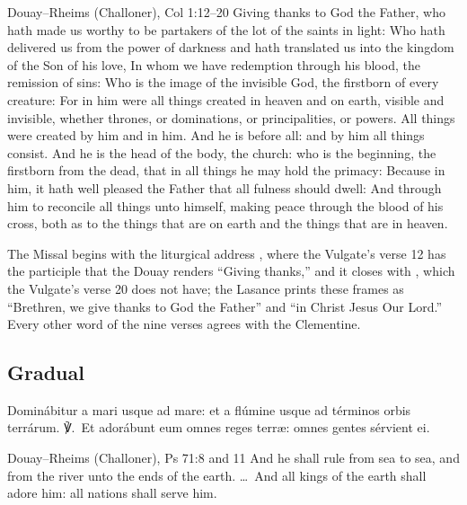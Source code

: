 \begin{englishwitness}{Douay--Rheims (Challoner), Col 1:12--20}
Giving thanks to God the Father, who hath made us worthy to be partakers of
the lot of the saints in light: Who hath delivered us from the power of
darkness and hath translated us into the kingdom of the Son of his love, In
whom we have redemption through his blood, the remission of sins: Who is the
image of the invisible God, the firstborn of every creature: For in him were
all things created in heaven and on earth, visible and invisible, whether
thrones, or dominations, or principalities, or powers. All things were created
by him and in him. And he is before all: and by him all things consist. And he
is the head of the body, the church: who is the beginning, the firstborn from
the dead, that in all things he may hold the primacy: Because in him, it hath
well pleased the Father that all fulness should dwell: And through him to
reconcile all things unto himself, making peace through the blood of his
cross, both as to the things that are on earth and the things that are in
heaven.
\end{englishwitness}

\noindent The Missal begins with the liturgical address , where the Vulgate's verse 12 has the participle  that the Douay renders ``Giving thanks,'' and it closes with , which the Vulgate's verse 20 does not have; the
Lasance prints these frames as ``Brethren, we give thanks to God the Father''
and ``in Christ Jesus Our Lord.'' Every other word of the nine verses agrees
with the Clementine.

\subsection{Gradual}
\label{proper-gradual}


\begin{latinproper}
Dominábitur a mari usque ad mare: et a flúmine usque ad términos orbis
terrárum. ℣.~Et adorábunt eum omnes reges terræ: omnes gentes sérvient ei.
\end{latinproper}

\begin{englishwitness}{Douay--Rheims (Challoner), Ps 71:8 and 11}
And he shall rule from sea to sea, and from the river unto the ends of the
earth. \dots\ And all kings of the earth shall adore him: all nations shall
serve him.
\end{englishwitness}

